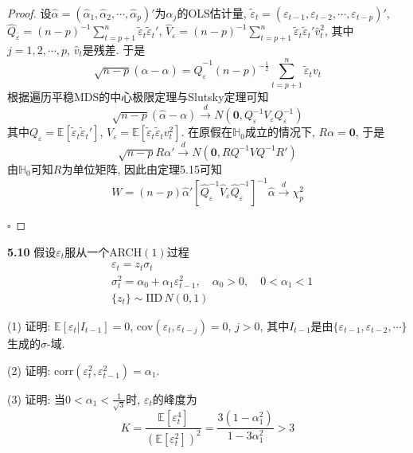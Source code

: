 \documentclass[cn,12pt,math=mtpro2,citestyle=gb7714-2015,bibstyle=gb7714-2015,twocol,mode=simple]{elegantbook}
\newcommand{\HH}{\mathbb{H}}
\newcommand{\E}{\mathbb{E}}
\begin{document}
\begin{proof}
设$\hat{\alpha}=(\hat{\alpha}_1,\hat{\alpha}_2,\cdots,\hat{\alpha}_p)'$为$\alpha_j$的OLS估计量, $\tilde{\varepsilon}_t=(\varepsilon_{t-1},\varepsilon_{t-2},\cdots,\varepsilon_{t-p})'$, $\hat{Q}_{\varepsilon}=(n-p)^{-1}\displaystyle\sum_{t=p+1}^{n}\tilde{\varepsilon}_t\tilde{\varepsilon}_t'$, $\hat{V}_\varepsilon=\displaystyle (n-p)^{-1}\sum_{t=p+1}^{n}\tilde{\varepsilon}_t\tilde{\varepsilon}_t'\hat{v}_t^2$, 其中$j=1,2,\cdots,p$, $\hat{v}_t$是残差. 于是
$$\sqrt{n-p}(\hat{\alpha}-\alpha)=\hat{Q}^{-1}_{\varepsilon}(n-p)^{-\frac{1}{2}}\sum_{t=p+1}^{n}\tilde{\varepsilon}_tv_t$$
根据遍历平稳MDS的中心极限定理与Slutsky定理可知
$$\sqrt{n-p}(\hat{\alpha}-\alpha)\xrightarrow{d} N(\mathbf{0},Q^{-1}_\varepsilon V_\varepsilon Q_\varepsilon^{-1})$$
其中$\displaystyle Q_\varepsilon=\E[\tilde{\varepsilon}_t\tilde{\varepsilon}_t']$, $V_\varepsilon=\displaystyle \E[\tilde{\varepsilon}_t\tilde{\varepsilon}_tv_t^2]$. 在原假在$\HH_0$成立的情况下, $R\alpha=\mathbf{0}$, 于是
$$\sqrt{n-p}R\alpha'\xrightarrow{d}N(\mathbf{0},RQ^{-1}VQ^{-1}R')$$
由$\HH_0$可知$R$为单位矩阵, 因此由定理5.15可知
$$W=(n-p)\hat{\alpha}'[\hat{Q}_\varepsilon^{-1}\hat{V}_\varepsilon\hat{Q}_\varepsilon^{-1}]^{-1}\hat{\alpha}\xrightarrow{d}\chi^2_p$$

$\square$
\end{proof}

\textbf{5.10} 假设$\varepsilon_t$服从一个ARCH$(1)$过程
\begin{align*}
& \varepsilon_t=z_t\sigma_t \\
& \sigma_t^2=\alpha_0+\alpha_1\varepsilon_{t-1}^2,\quad \alpha_0>0,\quad 0<\alpha_1<1 \\
& \{z_t\}\sim\text{IID}\, N(0,1)
\end{align*}

(1) 证明: $\E[\varepsilon_t|I_{t-1}]=0$, $\text{cov}(\varepsilon_t,\varepsilon_{t-j})=0$, $j>0$, 其中$I_{t-1}$是由$\{\varepsilon_{t-1},\varepsilon_{t-2},\cdots\}$生成的$\sigma$-域.

(2) 证明: $\text{corr}(\varepsilon_t^2,\varepsilon_{t-1}^2)=\alpha_1$.

(3) 证明: 当$\displaystyle0<\alpha_1<\frac{1}{\sqrt{3}}$时, $\varepsilon_t$的峰度为
$$K=\frac{\E[\varepsilon_t^4]}{(\E[\varepsilon_t^2])^2}=\frac{3(1-\alpha_1^2)}{1-3\alpha_1^2}>3$$
\end{document}
